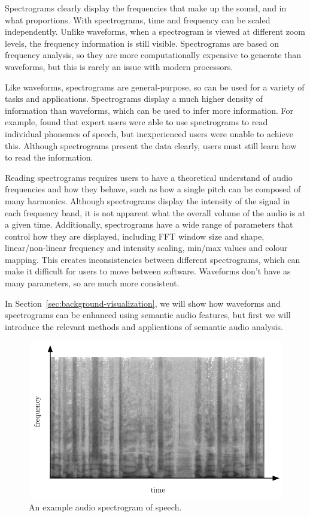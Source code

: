 Spectrograms clearly display the frequencies that make up the sound, and in what proportions.  With spectrograms, time
and frequency can be scaled independently. Unlike waveforms, when a spectrogram is viewed at different zoom levels, the
frequency information is still visible.  Spectrograms are based on frequency analysis, so they are more computationally
expensive to generate than waveforms, but this is rarely an issue with modern processors.

Like waveforms, spectrograms are general-purpose, so can be used for a variety of tasks and applications.  Spectrograms
display a much higher density of information than waveforms, which can be used to infer more information. For
example, \citet{Zue1979,Zue1986} found that expert users were able to use spectrograms to read individual phonemes of speech,
but inexperienced users were unable to achieve this.  Although spectrograms present the data clearly, users
must still learn how to read the information.  

Reading spectrograms requires users to have a theoretical understand of audio frequencies and how they behave, such as
how a single pitch can be composed of many harmonics.  Although spectrograms display the intensity of the signal in
each frequency band, it is not apparent what the overall volume of the audio is at a given time.  Additionally,
spectrograms have a wide range of parameters that control how they are displayed, including FFT window size and shape,
linear/non-linear frequency and intensity scaling, min/max values and colour mapping.  This creates inconsistencies
between different spectrograms, which can make it difficult for users to move between software.  Waveforms don't have
as many parameters, so are much more consistent.

In Section~\ref{sec:background-visualization}, we will show how waveforms and spectrograms can be enhanced using
semantic audio features, but first we will introduce the relevant methods and applications of semantic audio analysis.

\begin{figure}[h]
\centering
  \centering
  \includegraphics[width=.9\textwidth]{figs/spectrogram-example}
  \caption{An example audio spectrogram of speech.} 
  \label{fig:spectrogram-example}
\end{figure}









